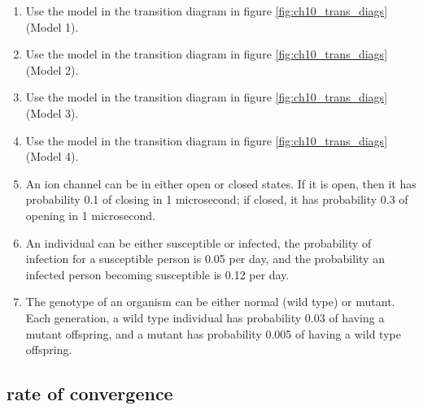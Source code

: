 \documentclass[
]{book}
\theoremstyle{definition}
\theoremstyle{definition}
\theoremstyle{definition}
\theoremstyle{remark}
\begin{document}
\begin{enumerate}
\def\labelenumi{\arabic{enumi}.}
\item
  Use the model in the transition diagram in figure \ref{fig:ch10_trans_diags} (Model 1).
\item
  Use the model in the transition diagram in figure \ref{fig:ch10_trans_diags} (Model 2).
\item
  Use the model in the transition diagram in figure \ref{fig:ch10_trans_diags} (Model 3).
\item
  Use the model in the transition diagram in figure \ref{fig:ch10_trans_diags} (Model 4).
\item
  An ion channel can be in either open or closed states. If it is open, then it has probability 0.1 of closing in 1 microsecond; if closed, it has probability 0.3 of opening in 1 microsecond.
\item
  An individual can be either susceptible or infected, the probability of infection for a susceptible person is 0.05 per day, and the probability an infected person becoming susceptible is 0.12 per day.
\item
  The genotype of an organism can be either normal (wild type) or mutant. Each generation, a wild type individual has probability 0.03 of having a mutant offspring, and a mutant has probability 0.005 of having a wild type offspring.
\end{enumerate}

\subsection{rate of convergence}
\end{document}
